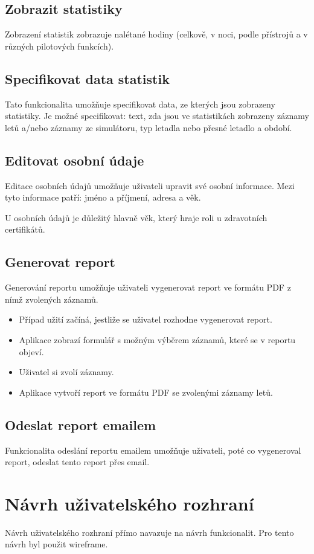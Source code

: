\documentclass[thesis=M,czech]{FITthesis}[2012/06/26]
\begin{document}
\subsection{Zobrazit statistiky}
Zobrazení statistik zobrazuje nalétané hodiny (celkově, v noci, podle přístrojů a v různých pilotových funkcích).

\subsection{Specifikovat data statistik}
Tato funkcionalita umožňuje specifikovat data, ze kterých jsou zobrazeny statistiky.
Je možné specifikovat: text, zda jsou ve statistikách zobrazeny záznamy letů a/nebo záznamy ze simulátoru, typ letadla nebo přesné letadlo a období.

\subsection{Editovat osobní údaje}
Editace osobních údajů umožňuje uživateli upravit své osobní informace. Mezi tyto informace patří: jméno a příjmení, adresa a věk.

U osobních údajů je důležitý hlavně věk, který hraje roli u zdravotních certifikátů.

\subsection{Generovat report}
Generování reportu umožňuje uživateli vygenerovat report ve formátu PDF z nímž zvolených záznamů.

\begin{itemize}
\item Případ užití začíná, jestliže se uživatel rozhodne vygenerovat report.
\item Aplikace zobrazí formulář s možným výběrem záznamů, které se v reportu objeví.
\item Uživatel si zvolí záznamy.
\item Aplikace vytvoří report ve formátu PDF se zvolenými záznamy letů.
\end{itemize}

\subsection{Odeslat report emailem}
Funkcionalita odeslání reportu emailem umožňuje uživateli, poté co vygeneroval report, odeslat tento report přes email.

\section{Návrh uživatelského rozhraní}
Návrh uživatelského rozhraní přímo navazuje na návrh funkcionalit. Pro tento návrh byl použit wireframe.
\end{document}
